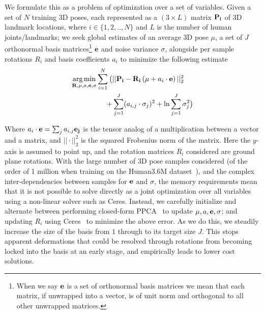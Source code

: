 \documentclass[10pt,twocolumn,letterpaper]{article}
\DeclareMathOperator*{\argmin}{arg\,min}
\begin{document}
We formulate this as a problem of optimization over a set of
variables. Given a set of $N$ training 3D poses, each represented as a
$(3 \times L)$ matrix ${\bf P_i}$ of 3D landmark locations, where
$i\in\{1,2,..,N\}$ and $L$ is the number of human joints/landmarks; we
seek global estimates of an average 3D pose $\mu$, a set of $J$
orthonormal basis matrices\footnote{When we say ${\bf e}$ is a set of
  orthonormal basis matrices we mean that each matrix, if unwrapped
  into a vector, is of unit norm and orthogonal to all other unwrapped
  matrices.} ${\bf e}$ and noise variance $\sigma$, alongside per
sample rotations $R_i$ and basis coefficients $a_i$ to minimize
the following estimate 
\begin{align}
\argmin_{{\bf R}, \mu , a, {\bf e}, \sigma} \sum_{i=1}^{N} \big( & ||{\bf P_i} - {\bf R_i}\left({\bf \mu} +a_i \cdot {\bf e}\right)||_2^2 \\
+                                                                   & \sum_{j=1}^{J} (a_{i,j}\cdot\sigma_j)^2
 +\ln \sum_{j=1}^{J} \sigma_j^2 \big)\nonumber
\end{align}

Where $a_i\cdot{\bf e}= \sum_j a_{i,j} {\bf e_j}$ is the tensor analog
of a multiplication between a vector and a matrix, and $||\cdot||_2^2$ is
the squared Frobenius norm of the matrix. Here the $y$-axis is assumed to point up, and the rotation matrices
$R_i$ considered are ground plane rotations. %
With the large number of 3D pose samples considered (of the order of 1 million
when training on the Human3.6M dataset~\cite{ionescu2014human3}), and the
complex inter-dependencies between samples for ${\bf e}$ and $\sigma$, the
memory requirements mean that it is not possible to solve directly as a joint
optimization over all variables using a non-linear solver such as Ceres.
Instead, we carefully initialize and alternate between performing closed-form
PPCA~\cite{Tipping99probabilisticprincipal} to update $\mu , a, {\bf e},
\sigma$; and updating ${R_i}$ using Ceres~\cite{ceres-solver} to minimize the
above error.
%
As we do this, we steadily increase the size of the basis from $1$
through to its target size $J$.  This stops apparent deformations that
could be resolved through rotations from becoming locked into the
basis at an early stage, and empirically leads to lower cost
solutions.
\end{document}
